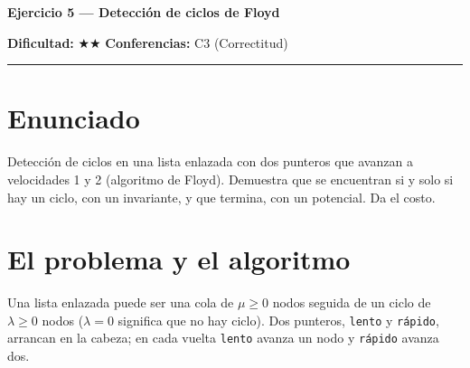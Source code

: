 \documentclass[11pt]{article}
\begin{document}
{\LARGE\bfseries\color{azultitulo} Ejercicio 5 --- Detección de ciclos de Floyd}

\vspace{2pt}
\textbf{Dificultad:} $\bigstar\bigstar$ \quad \textbf{Conferencias:} C3 (Correctitud)
\vspace{8pt}
\hrule
\vspace{12pt}

\section*{Enunciado}
\begin{enunciado}
Detección de ciclos en una lista enlazada con dos punteros que avanzan a velocidades 1 y 2 (algoritmo de
Floyd). Demuestra que se encuentran si y solo si hay un ciclo, con un invariante, y que termina, con un
potencial. Da el costo.
\end{enunciado}

\section{El problema y el algoritmo}

Una lista enlazada puede ser una cola de $\mu\ge 0$ nodos seguida de un ciclo de $\lambda\ge 0$ nodos
($\lambda=0$ significa que no hay ciclo). Dos punteros, \texttt{lento} y \texttt{rápido}, arrancan en la
cabeza; en cada vuelta \texttt{lento} avanza un nodo y \texttt{rápido} avanza dos.
\end{document}
